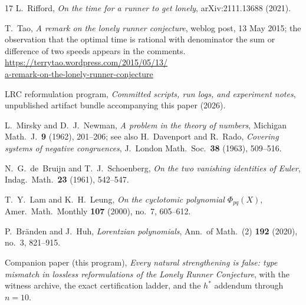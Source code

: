 \begin{thebibliography}{17}
L.~Rifford,
\emph{On the time for a runner to get lonely},
arXiv:2111.13688 (2021).

T.~Tao,
\emph{A remark on the lonely runner conjecture},
weblog post, 13 May 2015; the observation that the optimal time is
rational with denominator the sum or difference of two speeds appears
in the comments.
\\[2pt]
\url{https://terrytao.wordpress.com/2015/05/13/}\\
\url{a-remark-on-the-lonely-runner-conjecture}

LRC reformulation program,
\emph{Committed scripts, run logs, and experiment notes},
unpublished artifact bundle accompanying this paper (2026).

L.~Mirsky and D.~J.~Newman,
\emph{A problem in the theory of numbers},
Michigan Math.\ J.\ \textbf{9} (1962), 201--206; see also
H.~Davenport and R.~Rado, \emph{Covering systems of negative congruences},
J.\ London Math.\ Soc.\ \textbf{38} (1963), 509--516.

N.~G.~de~Bruijn and T.~J.~Schoenberg,
\emph{On the two vanishing identities of Euler},
Indag.\ Math.\ \textbf{23} (1961), 542--547.

T.~Y.~Lam and K.~H.~Leung,
\emph{On the cyclotomic polynomial $\Phi_{pq}(X)$},
Amer.\ Math.\ Monthly \textbf{107} (2000), no.~7, 605--612.

P.~Br\"anden and J.~Huh,
\emph{Lorentzian polynomials},
Ann.\ of Math.\ (2) \textbf{192} (2020), no.~3, 821--915.

Companion paper (this program),
\emph{Every natural strengthening is false: type mismatch in lossless
reformulations of the Lonely Runner Conjecture},
with the witness archive, the exact certification ladder, and the
$h^*$ addendum through $n=10$.

\end{thebibliography}
\endgroup
